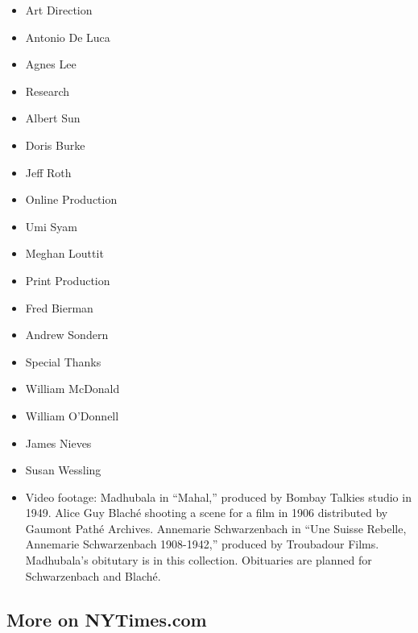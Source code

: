 \begin{itemize}
\tightlist
\item
  Art Direction
\item
  Antonio De Luca
\item
  Agnes Lee
\end{itemize}

\begin{itemize}
\tightlist
\item
  Research
\item
  Albert Sun
\item
  Doris Burke
\item
  Jeff Roth
\end{itemize}

\begin{itemize}
\tightlist
\item
  Online Production
\item
  Umi Syam
\item
  Meghan Louttit
\end{itemize}

\begin{itemize}
\tightlist
\item
  Print Production
\item
  Fred Bierman
\item
  Andrew Sondern
\end{itemize}

\begin{itemize}
\tightlist
\item
  Special Thanks
\item
  William McDonald
\item
  William O'Donnell
\item
  James Nieves
\item
  Susan Wessling
\end{itemize}

\begin{itemize}
\tightlist
\item
  Video footage: Madhubala in ``Mahal,'' produced by Bombay Talkies
  studio in 1949. Alice Guy Blaché shooting a scene for a film in 1906
  distributed by Gaumont Pathé Archives. Annemarie Schwarzenbach in
  ``Une Suisse Rebelle, Annemarie Schwarzenbach 1908-1942,'' produced by
  Troubadour Films. Madhubala's obitutary is in this collection.
  Obituaries are planned for Schwarzenbach and Blaché.
\end{itemize}

\hypertarget{more-on-nytimescom}{%
\subsection{More on NYTimes.com}\label{more-on-nytimescom}}

